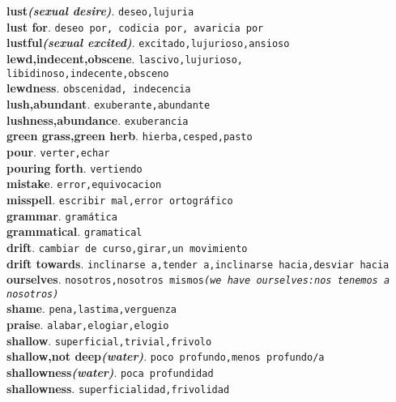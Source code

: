 \documentclass[twocolumn]{article}
\begin{document}
	\textsf{\textbf{lust{\scriptsize \textsl{(sexual desire)}}}}. \texttt{deseo,lujuria}\\
  \textsf{\textbf{lust for}}. \texttt{deseo por, codicia por, avaricia por}\\
	\textsf{\textbf{lustful{\scriptsize \textsl{(sexual excited)}}}}. \texttt{excitado,lujurioso,ansioso}\\
	\textsf{\textbf{lewd,indecent,obscene}}. \texttt{lascivo,lujurioso,\\libidinoso,indecente,obsceno}\\
	\textsf{\textbf{lewdness}}. \texttt{obscenidad, indecencia}\\
	\textsf{\textbf{lush,abundant}}. \texttt{exuberante,abundante}\\
	\textsf{\textbf{lushness,abundance}}. \texttt{exuberancia}\\
	\textsf{\textbf{green grass,green herb}}. \texttt{hierba,cesped,pasto}\\
	\textsf{\textbf{pour}}. \texttt{verter,echar}\\
	\textsf{\textbf{pouring forth}}. \texttt{vertiendo}\\
	\textsf{\textbf{mistake}}. \texttt{error,equivocacion}\\
	\textsf{\textbf{misspell}}. \texttt{escribir mal,error ortogr\'afico}\\
	\textsf{\textbf{grammar}}. \texttt{gram\'atica}\\
	\textsf{\textbf{grammatical}}. \texttt{gramatical}\\
	\textsf{\textbf{drift}}. \texttt{cambiar de curso,girar,un movimiento}\\
	\textsf{\textbf{drift towards}}. \texttt{inclinarse a,tender a,inclinarse hacia,desviar hacia}\\
	\textsf{\textbf{ourselves}}. \texttt{nosotros,nosotros mismos{\scriptsize \textsl{(we have ourselves:nos tenemos a nosotros)}}}\\
	\textsf{\textbf{shame}}. \texttt{pena,lastima,verguenza}\\
	\textsf{\textbf{praise}}. \texttt{alabar,elogiar,elogio}\\
	\textsf{\textbf{shallow}}. \texttt{superficial,trivial,frivolo}\\
  \textsf{\textbf{shallow,not deep{\scriptsize \textsl{(water)}}}}. \texttt{poco profundo,menos profundo/a}\\
	\textsf{\textbf{shallowness{\scriptsize \textsl{(water)}}}}. \texttt{poca profundidad}\\
	\textsf{\textbf{shallowness}}. \texttt{superficialidad,frivolidad}\\
\end{document}

